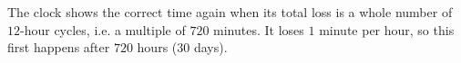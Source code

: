 The clock shows the correct time again when its total loss is a whole number of $12$-hour cycles, i.e. a multiple of $720$ minutes. It loses $1$ minute per hour, so this first happens after $\boxed{720}$ hours ($30$ days).
